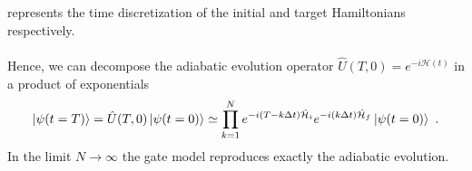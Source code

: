 represents the time discretization of the initial and target Hamiltonians respectively. \\\\
Hence, we can decompose the adiabatic evolution operator $\hat{U}(T,0) = e^{-i\mathcal{H}(t)}$ in a product of exponentials
\begin{equation}
    \ket{\psi(t = T)} = \hat{U}(T,0)\ket{\psi(t = 0)} \simeq \prod_{k=1}^{N}e^{-i\left(T-k\Delta t\right)\hat{\mathcal{H}}_{i}}e^{-i\left(k\Delta t\right)\hat{\mathcal{H}}_{f}}\ket{\psi(t = 0)}\ . 
\end{equation}
In the limit $N \rightarrow \infty$ the gate model reproduces exactly the adiabatic evolution.
